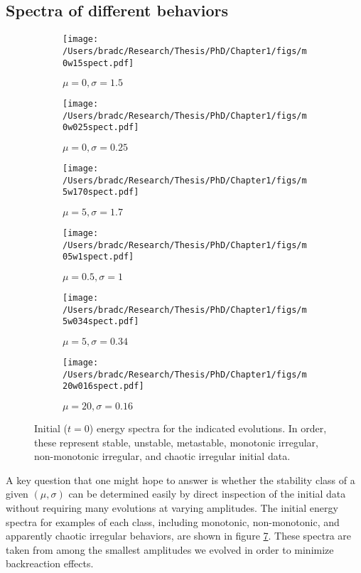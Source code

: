 \documentclass[../PhD.tex]{subfiles}
\begin{document}
\subsection{Spectra of different behaviors}
\begin{figure}[!t]
\centering
\begin{subfigure}[t]{0.32\textwidth}
\texttt{[image: /Users/bradc/Research/Thesis/PhD/Chapter1/figs/m0w15spect.pdf]}
\caption{$\mu=0,\sigma=1.5$}
\label{f:m0w15spect}
\end{subfigure}
\begin{subfigure}[t]{0.32\textwidth}
\texttt{[image: /Users/bradc/Research/Thesis/PhD/Chapter1/figs/m0w025spect.pdf]}
\caption{$\mu=0,\sigma=0.25$}
\label{f:m0w025spect}
\end{subfigure}
\begin{subfigure}[t]{0.32\textwidth}
\texttt{[image: /Users/bradc/Research/Thesis/PhD/Chapter1/figs/m5w170spect.pdf]}
\caption{$\mu=5,\sigma=1.7$}
\label{f:m5w170spect}
\end{subfigure}
\begin{subfigure}[t]{0.32\textwidth}
\texttt{[image: /Users/bradc/Research/Thesis/PhD/Chapter1/figs/m05w1spect.pdf]}
\caption{$\mu=0.5,\sigma=1$}
\label{f:m05w1spect}
\end{subfigure}
\begin{subfigure}[t]{0.32\textwidth}
\texttt{[image: /Users/bradc/Research/Thesis/PhD/Chapter1/figs/m5w034spect.pdf]}
\caption{$\mu=5,\sigma=0.34$}
\label{f:m5w034spect}
\end{subfigure}
\begin{subfigure}[t]{0.32\textwidth}
\texttt{[image: /Users/bradc/Research/Thesis/PhD/Chapter1/figs/m20w016spect.pdf]}
\caption{$\mu=20,\sigma=0.16$}
\label{f:m15w150spect}
\end{subfigure}
\caption[Initial energy spectra for each type of initial data]{Initial ($t=0$) energy spectra for the indicated evolutions. In order,
these represent stable, unstable, metastable, monotonic irregular,
non-monotonic irregular, and chaotic irregular initial data.}
\label{f:initialspect}
\end{figure}

A key question that one might hope to answer is whether the stability class
of a given $(\mu,\sigma)$ can be determined easily by direct inspection
of the initial data without requiring many evolutions at varying amplitudes.
The initial energy spectra for examples of each class, including monotonic,
non-monotonic, and apparently chaotic irregular behaviors, are shown in figure
\ref{f:initialspect}.  These spectra are taken from among the smallest
amplitudes we evolved in order to minimize backreaction effects.
\end{document}
